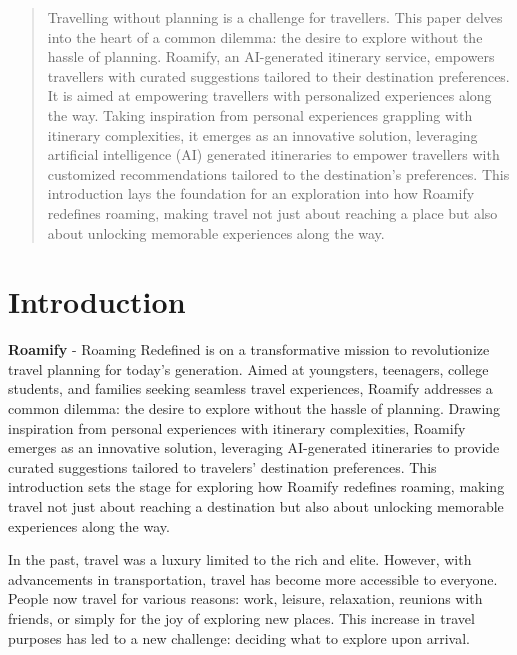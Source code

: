 \documentclass[conference]{IEEEtran}
\begin{document}
\begin{abstract}

    Travelling without planning is a challenge for travellers. This paper delves into the heart of a common dilemma: the desire to explore without the hassle of planning. Roamify, an AI-generated itinerary service, empowers travellers with curated suggestions tailored to their destination preferences. It is aimed at empowering travellers with personalized experiences along the way. Taking inspiration from personal experiences grappling with itinerary complexities, it emerges as an innovative solution, leveraging artificial intelligence (AI) generated itineraries to empower travellers with customized recommendations tailored to the destination's preferences. This introduction lays the foundation for an exploration into how Roamify redefines roaming, making travel not just about reaching a place but also about unlocking memorable experiences along the way.

\end{abstract}

\IEEEpeerreviewmaketitle

\section{Introduction}

    \textbf{Roamify} - Roaming Redefined is on a transformative mission to revolutionize travel planning for today's generation. Aimed at youngsters, teenagers, college students, and families seeking seamless travel experiences, Roamify addresses a common dilemma: the desire to explore without the hassle of planning. Drawing inspiration from personal experiences with itinerary complexities, Roamify emerges as an innovative solution, leveraging AI-generated itineraries to provide curated suggestions tailored to travelers' destination preferences. This introduction sets the stage for exploring how Roamify redefines roaming, making travel not just about reaching a destination but also about unlocking memorable experiences along the way.

    In the past, travel was a luxury limited to the rich and elite. However, with advancements in transportation, travel has become more accessible to everyone. People now travel for various reasons: work, leisure, relaxation, reunions with friends, or simply for the joy of exploring new places. This increase in travel purposes has led to a new challenge: deciding what to explore upon arrival.
\end{document}
